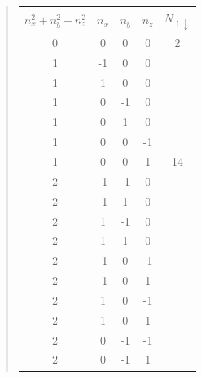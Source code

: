 \begin{quote}
\begin{tabular}{ccccc}
\hline
\multicolumn{1}{c}{ $n_{x}^{2}+n_{y}^{2}+n_{z}^{2}$ } & \multicolumn{1}{c}{ $n_{x}$ } & \multicolumn{1}{c}{ $n_{y}$ } & \multicolumn{1}{c}{ $n_{z}$ } & \multicolumn{1}{c}{ $N_{\uparrow \downarrow }$ } \\
\hline
0                               & 0       & 0       & 0       & 2                          \\
\hline
1                               & -1      & 0       & 0       &                            \\
1                               & 1       & 0       & 0       &                            \\
1                               & 0       & -1      & 0       &                            \\
1                               & 0       & 1       & 0       &                            \\
1                               & 0       & 0       & -1      &                            \\
1                               & 0       & 0       & 1       & 14                         \\
\hline
2                               & -1      & -1      & 0       &                            \\
2                               & -1      & 1       & 0       &                            \\
2                               & 1       & -1      & 0       &                            \\
2                               & 1       & 1       & 0       &                            \\
2                               & -1      & 0       & -1      &                            \\
2                               & -1      & 0       & 1       &                            \\
2                               & 1       & 0       & -1      &                            \\
2                               & 1       & 0       & 1       &                            \\
2                               & 0       & -1      & -1      &                            \\
2                               & 0       & -1      & 1       &                            \\

\end{tabular}
\end{quote}
